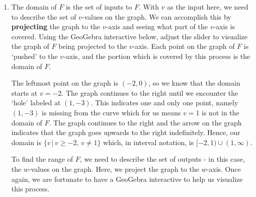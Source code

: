 \documentclass{ximera}
\begin{document}
\begin{example}
\begin{enumerate}
\begin{enumerate}
 

To solve $F(v) = 0$, we are looking for the $v$-values where the output, or associated $w$ value, is $0$.  Hence, we are looking for points on the graph with a $w$-coordinate of $0$.  We find two such points, $(-2,0)$ and $(2,0)$, so our solutions to $F(v) = 0$ are $v = \pm 2$.  Pictures highlighting the relevant graphical features are given at the top of the next page.




 

\item  The domain of $F$ is the set of inputs to $F$.  With $v$ as the input here,  we need to describe the set of $v$-values on the graph.  We can accomplish this by  \textbf{projecting} the graph to the $v$-axis and seeing what part of the $v$-axis is covered.   Using the GeoGebra interactive below, adjust the slider to visualize the graph of $F$ being projected to the $v$-axis.  Each point on the graph of $F$ is `pushed' to the $v$-axis, and the portion which is covered by this process is the domain of $F$.



\begin{center}
\end{center}


The leftmost point on the graph is $(-2,0)$, so we know that the domain starts at $v=-2$.  The graph continues to the right until we encounter the `hole' labeled at $(1,-3)$.  This indicates one and only one point, namely $(1,-3)$ is missing from the curve which for us means $v = 1$ is not in the domain of $F$.  The graph continues to the right and the arrow on the graph indicates that the graph goes upwards to the right indefinitely.  Hence, our domain is $\{ v \, | \, v \geq -2, \, v \neq 1 \}$ which, in interval notation, is $[-2, 1) \cup (1, \infty)$. 


To find the range of $F$, we need to describe the set of outputs - in this case, the $w$-values on the graph.  Here, we project the graph to the $w$-axis.  Once again, we are fortunate to have a GeoGebra interactive to help us visualize this process.

\begin{center}
\end{center}




\end{enumerate}
\end{enumerate}
\end{example}
\end{document}
